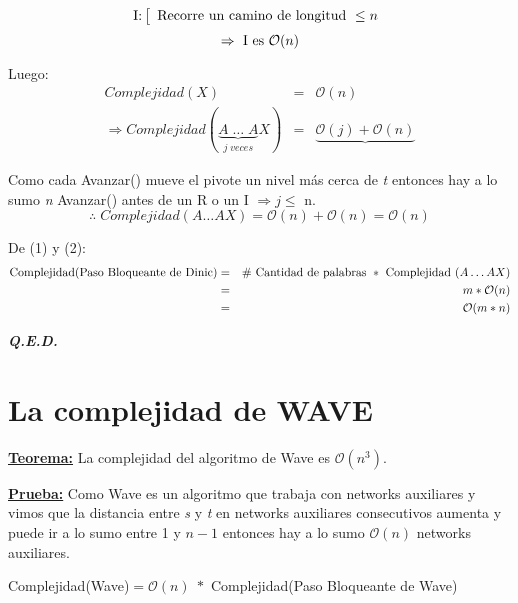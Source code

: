 \documentclass[12pt,a4paper]{report}
\newcommand{\QED}{\hfill \textit{\textbf{Q.E.D.}}}
\begin{document}
\begin{enumerate}
					\begin{equation*}
						\textup{I:}
						\left[
						\begin{array}{l}
							\textup{Recorre un camino de longitud } \leq n
						\end{array}
						\right.
					\end{equation*}
					\[ \Rightarrow \textup{ I es } \mathcal{O}(n) \]

					\par Luego:
					\begin{eqnarray}
						\nonumber Complejidad(X) &=& \mathcal{O}(n) \\
						\nonumber \Rightarrow Complejidad (\underbrace{A \; \dotsc \; A}_{j \; veces}X) &=& \underbrace{\mathcal{O}(j) + \mathcal{O}(n)}
					\end{eqnarray}

					\par Como cada Avanzar() mueve el pivote un nivel más cerca de \textit{t} entonces hay a lo sumo \textit{n} Avanzar() antes de un R o un I $\Rightarrow j\leq$ n.
					\[ \therefore \; Complejidad(A \dotsc AX) = \mathcal{O}(n) + \mathcal{O}(n) = \mathcal{O}(n)\]
			\end{enumerate}

			\par De (1) y (2):
			\begin{eqnarray}
				\nonumber \textup{Complejidad(Paso Bloqueante de Dinic)} &=& \# \textup{ Cantidad de palabras } * \textup{ Complejidad } (A \dotsc A X) \\
				\nonumber &=& m * \mathcal{O}(n) \\
				\nonumber &=& \mathcal{O}(m*n)
			\end{eqnarray}

		\QED


	\section{La complejidad de WAVE}
		\textbf{\underline{Teorema:}} La complejidad del algoritmo de Wave es $\mathcal{O}(n^{3})$.

		\textbf{\underline{Prueba:}} Como Wave es un algoritmo que trabaja con networks auxiliares y vimos que la distancia entre \textit{s} y \textit{t} en networks auxiliares consecutivos aumenta y puede ir a lo sumo entre 1 y $n - 1$ entonces hay a lo sumo $\mathcal{O}(n)$ networks auxiliares.
			\begin{center}
				Complejidad(Wave)$ = \mathcal{O}(n) \; *$ Complejidad(Paso Bloqueante de Wave)
			\end{center}
\end{document}
